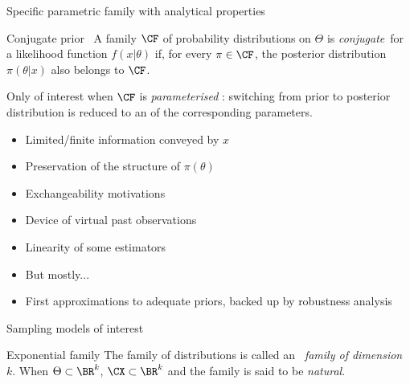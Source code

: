 \begin{slide}[label=conju]

Specific parametric family with analytical properties

\begin{block}{Conjugate prior}\label{def:3.1} \ A family $\CF$ of 
probability distributions on $\Theta$ is {\it conjugate}\ 
for a likelihood function $f(x|\theta)$ if, for every $\pi \in \CF$, 
the posterior distribution $\pi(\theta|x)$ also belongs to $\CF$.
\end{block}

\pause
\medskip
Only of interest when $\CF$ is {\it parameterised} :
switching from prior to posterior distribution is reduced 
to an {} of the corresponding parameters. 

\end{slide}\begin{slide}

\begin{itemize}
\item Limited/finite information conveyed by $x$ 
\item Preservation of the structure of $\pi(\theta)$
\pause
\item Exchangeability motivations
\item Device of virtual past observations
\pause
\item Linearity of some estimators
\item But mostly... \pause {}
\pause
\item First approximations to adequate priors, backed up by robustness analysis
\end{itemize}

\end{slide}\begin{slide}
\slidetitle{Exponential families}

Sampling models of interest

\begin{block}{Exponential family} The family of distributions 
{\Brown{\[
f(x|\theta) = C(\theta) h(x) \exp\{R(\theta)\cdot T(x) \}
\]}}
is called an {\em \expo\ family of dimension $k$}.  When $\Theta 
\subset \BR^k$, $\CX \subset \BR^k$ and
{\Brown{\[
f(x|\theta) = h(x) \exp\{\theta\cdot x - \Psi(\theta) \},
\]}}
the family is said to be {\em natural}.
\end{block}


\end{slide}
